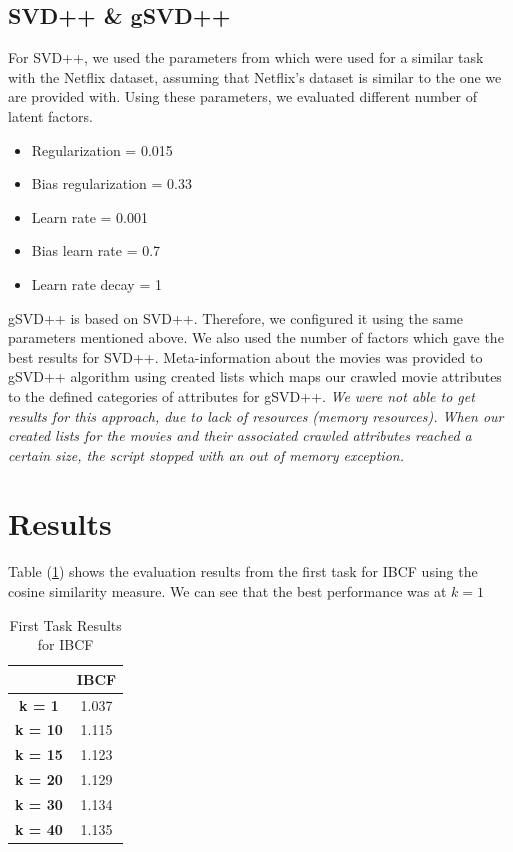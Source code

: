 \documentclass{sigish}
\begin{document}
\subsection{SVD++ \& gSVD++}
For SVD++, we used the parameters from \cite{Koren:2009} which were used for a similar task with the Netflix dataset, assuming that Netflix's dataset is similar to the one we are provided with. Using these parameters, we evaluated different number of latent factors.
\begin{itemize}
\item Regularization = 0.015
\item Bias regularization = 0.33
\item Learn rate = 0.001
\item Bias learn rate = 0.7
\item Learn rate decay = 1
\end{itemize}

gSVD++ is based on SVD++. Therefore, we configured it using the same parameters mentioned above. We also used the number of factors which gave the best results for SVD++. Meta-information about the movies was provided to gSVD++ algorithm using created lists which maps our crawled movie attributes to the defined categories of attributes for gSVD++.
\emph{We were not able to get results for this approach, due to lack of resources (memory resources). When our created lists for the movies and their associated crawled attributes reached a certain size, the script stopped with an out of memory exception.}

\section{Results}

Table (\ref{tab:eval_00}) shows the evaluation results from the first task for IBCF using the cosine similarity measure. We can see that the best performance was at $ k = 1 $

\begin{table}[]
\centering
\begin{tabular}{|c|c|}
\hline
                & \textbf{IBCF} \\ \hline
\textbf{k = 1}  & 1.037         \\ \hline
\textbf{k = 10} & 1.115         \\ \hline
\textbf{k = 15} & 1.123         \\ \hline
\textbf{k = 20} & 1.129         \\ \hline
\textbf{k = 30} & 1.134         \\ \hline
\textbf{k = 40} & 1.135         \\ \hline
\end{tabular}
\caption{First Task Results for IBCF}
\label{tab:eval_00}
\end{table}
\end{document}
